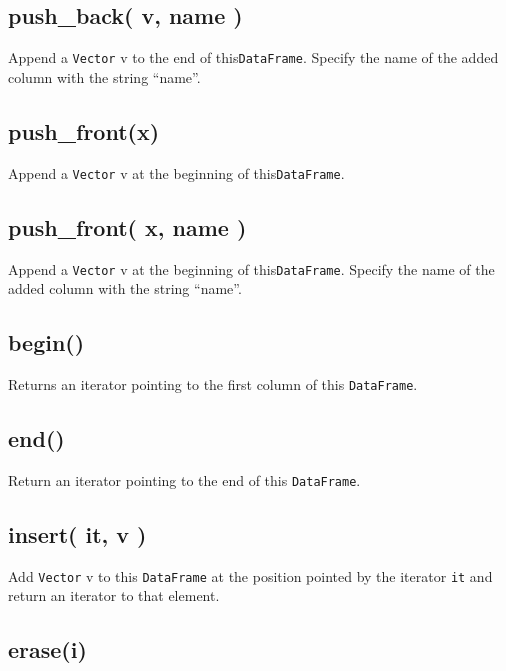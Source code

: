 \documentclass[
]{book}
\begin{document}
\hypertarget{push_back-v-name}{%
\subsection{push\_back( v, name )}\label{push_back-v-name}}

Append a \texttt{Vector} v to the end of this\texttt{DataFrame}. Specify the name of the added column with the string ``name''.

\hypertarget{push_frontx}{%
\subsection{push\_front(x)}\label{push_frontx}}

Append a \texttt{Vector} v at the beginning of this\texttt{DataFrame}.

\hypertarget{push_front-x-name}{%
\subsection{push\_front( x, name )}\label{push_front-x-name}}

Append a \texttt{Vector} v at the beginning of this\texttt{DataFrame}. Specify the name of the added column with the string ``name''.

\hypertarget{begin}{%
\subsection{begin()}\label{begin}}

Returns an iterator pointing to the first column of this \texttt{DataFrame}.

\hypertarget{end}{%
\subsection{end()}\label{end}}

Return an iterator pointing to the end of this \texttt{DataFrame}.

\hypertarget{insert-it-v}{%
\subsection{insert( it, v )}\label{insert-it-v}}

Add \texttt{Vector} v to this \texttt{DataFrame} at the position pointed by the iterator \texttt{it} and return an iterator to that element.

\hypertarget{erasei}{%
\subsection{erase(i)}\label{erasei}}
\end{document}
